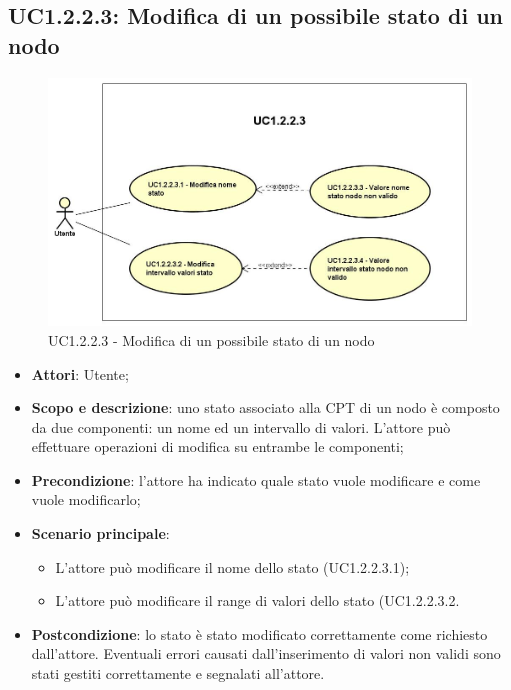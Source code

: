 \subsection{UC1.2.2.3: Modifica di un possibile stato di un nodo} 
\hypertarget{UC1.2.2.3}{} 
\begin{figure} [H]
	\centering
	\includegraphics[scale=0.45]{Img/UC1-2-2-3} 
	\caption{UC1.2.2.3 - Modifica di un possibile stato di un nodo} \label{} 
\end{figure} 
\begin{itemize} 
	\item{\textbf{Attori}: Utente;} 
	\item{\textbf{Scopo e descrizione}: uno stato associato alla CPT di un nodo è composto da due componenti: un nome ed un intervallo di valori. L'attore può effettuare operazioni di modifica su entrambe le componenti;} 
	\item{\textbf{Precondizione}: l'attore ha indicato quale stato vuole modificare e come vuole modificarlo;} 
	\item{\textbf{Scenario principale}: 
		\begin{itemize} 
			\item{L'attore può modificare il nome dello stato  (UC1.2.2.3.1);} 
			\item{L'attore può modificare il range di valori dello stato  (UC1.2.2.3.2.} 
		\end{itemize} 			
	} 
	\item{\textbf{Postcondizione}: lo stato è stato modificato correttamente come richiesto dall'attore. Eventuali errori causati dall'inserimento di valori non validi sono stati gestiti correttamente e segnalati all'attore.} 
\end{itemize} 
